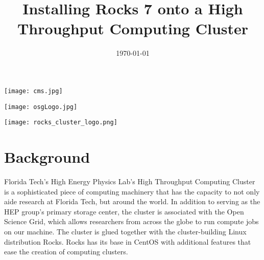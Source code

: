 \documentclass[12pt]{article}
\begin{document}

\title{Installing Rocks 7 onto a High Throughput Computing Cluster}

\date{\today}

\thispagestyle{empty}

\maketitle

\begin{multicols}{2}

\begin{center}
  \texttt{[image: cms.jpg]}
\end{center}

\begin{center}
  \texttt{[image: osgLogo.jpg]}
\end{center}

\begin{center}
  \texttt{[image: rocks\_cluster\_logo.png]}
\end{center}

\end{multicols}

\thispagestyle{empty}

\newpage



\tableofcontents

\newpage



\section{Background}

\qq Florida Tech's High Energy Physics Lab's High Throughput Computing Cluster
is a sophisticated piece of computing machinery that has the capacity to not
only aide research at Florida Tech, but around the world. In addition to serving
as the HEP group's primary storage center, the cluster is associated with the
Open Science Grid, which allows researchers from across the globe to run compute
jobs on our machine. The cluster is glued together with the cluster-building Linux distribution
Rocks. Rocks has its base in CentOS with additional features that ease the
creation of computing clusters. 
\end{document}
